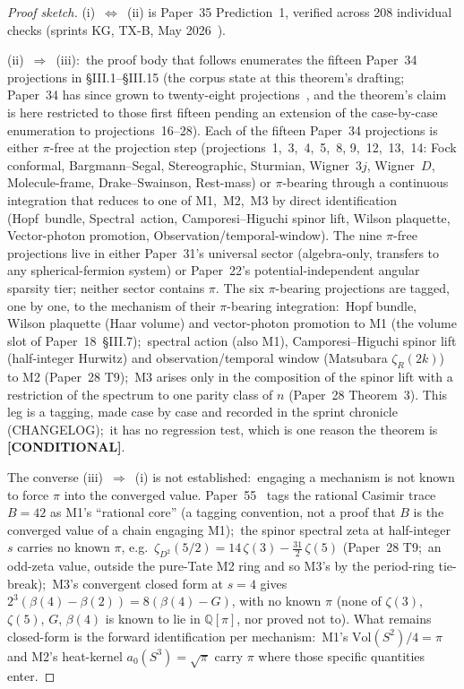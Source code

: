 \documentclass[11pt]{article}
\begin{document}
\begin{proof}[Proof sketch]
(i)~$\Leftrightarrow$~(ii) is Paper~35 Prediction~1, verified across
208 individual checks (sprints KG, TX-B, May 2026~\cite{paper35}).

(ii)~$\Rightarrow$~(iii):\ the proof body that follows enumerates the
fifteen Paper~34 projections in §III.1--§III.15 (the corpus state at
this theorem's drafting; Paper~34 has since grown to twenty-eight
projections~\cite{paper34}, and the theorem's claim is here restricted
to those first fifteen pending an extension of the case-by-case
enumeration to projections~16--28).  Each of the fifteen Paper~34
projections is
either $\pi$-free at the projection step (projections~1,~3,~4,~5,~8,
9,~12,~13,~14: Fock conformal, Bargmann--Segal, Stereographic, Sturmian,
Wigner~$3j$, Wigner~$D$, Molecule-frame, Drake--Swainson, Rest-mass) or
$\pi$-bearing through a continuous integration that reduces to one of
M1,~M2,~M3 by direct identification (Hopf~bundle, Spectral~action,
Camporesi--Higuchi spinor lift, Wilson plaquette, Vector-photon promotion,
Observation/temporal-window).  The nine $\pi$-free projections live in
either Paper~31's universal sector (algebra-only, transfers to any
spherical-fermion system) or Paper~22's potential-independent angular
sparsity tier; neither sector contains $\pi$.  The six $\pi$-bearing
projections are tagged, one by one, to the mechanism of their
$\pi$-bearing integration:\ Hopf bundle, Wilson plaquette (Haar volume)
and vector-photon promotion to M1 (the volume slot of Paper~18~\S III.7);\ spectral action (also
M1), Camporesi--Higuchi spinor lift (half-integer Hurwitz) and
observation/temporal window (Matsubara $\zeta_R(2k)$) to M2 (Paper~28
T9);\ M3 arises only in the composition of the spinor lift with a
restriction of the spectrum to one parity class of $n$ (Paper~28
Theorem~3).  This leg is a tagging, made
case by case and recorded in the sprint chronicle (CHANGELOG);\ it has
no regression test, which is one reason the theorem is
\textbf{[CONDITIONAL]}.

The converse (iii)~$\Rightarrow$~(i) is not established:\
engaging a mechanism is not known to force $\pi$ into the converged
value.
Paper~55~\cite{loutey_paper55} tags the rational Casimir trace $B = 42$ as M1's
``rational core'' (a tagging convention, not a proof that $B$ is the
converged value of a chain engaging M1);\ the spinor spectral
zeta at half-integer $s$ carries no known $\pi$,
e.g.\ $\zeta_{D^2}(5/2) = 14\,\zeta(3) - \tfrac{31}{2}\,\zeta(5)$
(Paper~28 T9;\ an odd-zeta value, outside the pure-Tate M2 ring and
so M3's by the period-ring tie-break);\ M3's
convergent closed form at $s = 4$ gives
$2^{3}(\beta(4) - \beta(2)) = 8(\beta(4) - G)$, with no known $\pi$
(none of $\zeta(3)$, $\zeta(5)$, $G$, $\beta(4)$ is known to lie in
$\mathbb{Q}[\pi]$, nor proved not to).  What remains
closed-form is the forward identification per mechanism:\ M1's
$\mathrm{Vol}(S^2)/4 = \pi$ and M2's heat-kernel $a_0(S^3) = \sqrt{\pi}$
carry $\pi$ where those specific quantities enter.
\end{proof}
\end{document}

